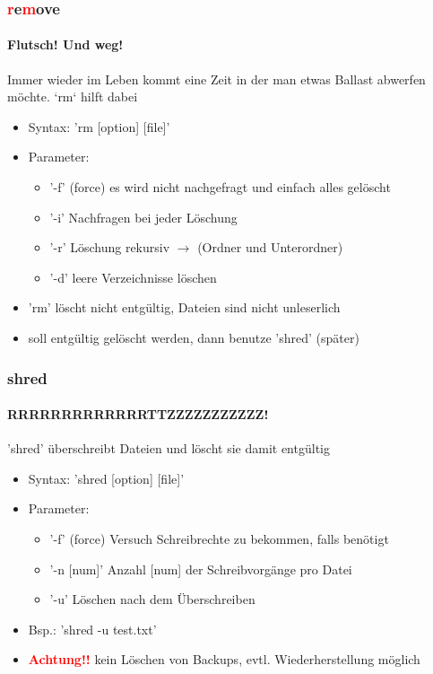 \documentclass[12pt,utf8, handout]{beamer}
\begin{document}
\begin{frame}
\frametitle{\textcolor{red}{r}e\textcolor{red}{m}ove}
\framesubtitle{\textcolor{ownDarkOr}{Flutsch! Und weg!}}
Immer wieder im Leben kommt eine Zeit in der man etwas Ballast abwerfen möchte.  
`rm` hilft dabei
\begin{itemize}[<+->]
	\item Syntax: 'rm [option] [file]'
	\item Parameter:
	\begin{itemize}[<+->]
		\item '-f' (force) es wird nicht nachgefragt und einfach alles gelöscht
		\item '-i' Nachfragen bei jeder Löschung
		\item '-r' Löschung rekursiv $\to$ (Ordner und Unterordner)
		\item '-d' leere Verzeichnisse löschen
	\end{itemize}
	\item 'rm' löscht nicht entgültig, Dateien sind nicht unleserlich
	\item soll entgültig gelöscht werden, dann benutze 'shred' (später)
\end{itemize}
\end{frame}

\begin{frame}
\frametitle{shred}
\framesubtitle{\textcolor{ownDarkOr}{RRRRRRRRRRRRRTTZZZZZZZZZZZ!}}
'shred' überschreibt Dateien und löscht sie damit entgültig
\begin{itemize}
	\item Syntax: 'shred [option] [file]'
	\item Parameter:
	\begin{itemize}[<+->]
		\item '-f' (force) Versuch Schreibrechte zu bekommen, falls benötigt
		\item '-n [num]' Anzahl [num] der Schreibvorgänge pro Datei
		\item '-u' Löschen nach dem Überschreiben
	\end{itemize}
	\item Bsp.: 'shred -u test.txt'
	\item \textbf{\textcolor{red}{Achtung!!}} kein Löschen von Backups, evtl. Wiederherstellung möglich
\end{itemize}
\end{frame}
\end{document}
